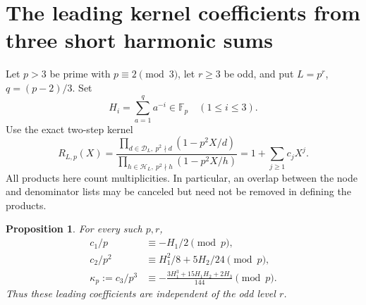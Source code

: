 \documentclass[11pt,letterpaper]{article}
\newtheorem{proposition}[theorem]{Proposition}
\numberwithin{equation}{section}
\begin{document}
\section{The leading kernel coefficients from three short harmonic sums}\label{loc-VIII-16}
\label{VIII-sec:E7harmonic}
Let $p>3$ be prime with $p\equiv2\pmod3$, let $r\ge3$ be odd,
and put $L=p^r$, $q=(p-2)/3$. Set
\[
 H_i=\sum_{a=1}^{q}a^{-i}\in\mathbb F_p\quad(1\le i\le3).
\]
Use the exact two-step kernel
\[
 R_{L,p}(X)=
 \frac{\prod_{d\in\mathcal D_L,\ p^2\nmid d}(1-p^2X/d)}
 {\prod_{h\in\mathcal H_L,\ p^2\nmid h}(1-p^2X/h)}
 =1+\sum_{j\ge1}c_jX^j.
\]
All products here count multiplicities. In particular, an overlap
between the node and denominator lists may be canceled but need
not be removed in defining the products.

\begin{proposition}\label{VIII-E7:harmonic-kernel}
For every such $p,r$,
\begin{align*}
 c_1/p&\equiv-H_1/2\pmod p,\\
 c_2/p^2&\equiv H_1^2/8+5H_2/24\pmod p,\\
 \kappa_p:=c_3/p^3&\equiv
 -\frac{3H_1^3+15H_1H_2+2H_3}{144}\pmod p.
\end{align*}
Thus these leading coefficients are independent of the odd level $r$.
\end{proposition}
\end{document}
